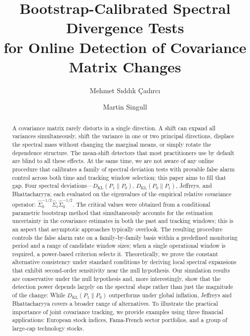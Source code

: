 \documentclass[11pt,a4paper]{article}
\title{\textbf{Bootstrap-Calibrated Spectral Divergence Tests\\
for Online Detection of Covariance Matrix Changes}}
\author[1]{Mehmet S\i dd\i k \c{C}ad\i rc\i}
\author[2,*]{Martin Singull}
\affil[1]{Faculty of Science, Department of Statistics,
          Cumhuriyet University, Sivas, T\"urkiye}
\affil[2]{Department of Mathematics,
          Link\"oping University, Link\"oping, Sweden}
\affil[*]{Corresponding author:
          \href{mailto:martin.singull@liu.se}{\texttt{martin.singull@liu.se}}}
\date{}
\newcommand{\KL}{\mathrm{KL}}
\begin{document}
\maketitle

\begin{abstract}
A covariance matrix rarely distorts in a single direction. A shift can expand all
variances simultaneously, shift the variance in one or two principal directions, displace the spectral mass without changing the marginal means, or simply
rotate the dependence structure. The mean-shift detectors that most practitioners use by default are blind to all these effects. At the same
time, we are not aware of any online procedure that calibrates a family of spectral deviation tests with provable false alarm control across both time and tracking window selection; this paper aims to fill that gap. Four spectral
deviations—$D_{\KL}(P_{1}\|P_{0})$, $D_{\KL}(P_{0}\|P_{1})$, Jeffreys, and
Bhattacharyya; each evaluated on the eigenvalues of the empirical relative
covariance operator: $\widehat{\Sigma}_{0}^{-1/2}\widehat{\Sigma}_{t}\widehat{\Sigma}_{0}^{-1/2}$.
The critical values were obtained from a conditional parametric bootstrap method that simultaneously accounts for
the estimation uncertainty in the covariance estimates in both the past and tracking windows;
this is an aspect that asymptotic approaches typically
overlook. The resulting procedure controls the false alarm rate on a family-by-family basis within a predefined monitoring period and a range of candidate window sizes;
when a single operational window is required, a power-based criterion
selects it. Theoretically, we prove the constant alternative consistency under standard conditions
by deriving local spectral expansions that exhibit second-order sensitivity near the null hypothesis. Our simulation results are conservative under the null hypothesis
and, more interestingly, show that the detection power depends largely on the spectral \emph{shape}
rather than just the magnitude of the change:
While $D_{\KL}(P_{1}\|P_{0})$ outperforms under global inflation, Jeffreys and
Bhattacharyya covers a broader range of alternatives. To illustrate the practical importance of
joint covariance tracking, we provide examples using three financial
applications: European stock indices, Fama-French sector portfolios,
and a group of large-cap technology stocks.


\end{abstract}
\end{document}
